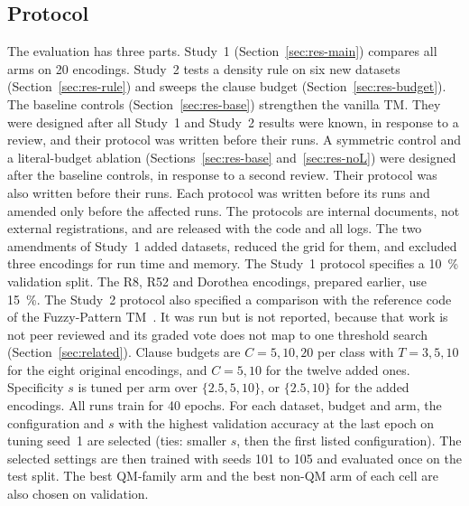 \documentclass[preprint,12pt,times]{elsarticle}
\newcommand{\add}[1]{{\color{blue}#1}}
\begin{document}
\subsection{Protocol}
\label{sec:protocol}
The evaluation has three parts. Study~1 (Section~\ref{sec:res-main}) compares all arms on 20 encodings. Study~2 tests a density rule on six new datasets (Section~\ref{sec:res-rule}) and sweeps the clause budget (Section~\ref{sec:res-budget}). The baseline controls (Section~\ref{sec:res-base}) strengthen the vanilla TM. They were designed after all Study~1 and Study~2 results were known, in response to a review, and their protocol was written before their runs.
\add{A symmetric control and a literal-budget ablation (Sections~\ref{sec:res-base} and~\ref{sec:res-noL}) were designed after the baseline controls, in response to a second review. Their protocol was also written before their runs.}
Each protocol was written before its runs and amended only before the affected runs. The protocols are internal documents, not external registrations, and are released with the code and all logs.
The two amendments of Study~1 added datasets, reduced the grid for them, and excluded three encodings for run time and memory.
The Study~1 protocol specifies a \SI{10}{\percent} validation split. The R8, R52 and Dorothea encodings, prepared earlier, use \SI{15}{\percent}.
The Study~2 protocol also specified a comparison with the reference code of the Fuzzy-Pattern TM~\cite{hnilov2025fptm}. It was run but is not reported, because that work is not peer reviewed and its graded vote does not map to one threshold search (Section~\ref{sec:related}).
Clause budgets are $C = 5, 10, 20$ per class with $T = 3, 5, 10$ for the eight original encodings, and $C = 5, 10$ for the twelve added ones.
Specificity $s$ is tuned per arm over $\{2.5, 5, 10\}$, or $\{2.5, 10\}$ for the added encodings.
All runs train for 40 epochs.
For each dataset, budget and arm, the configuration and $s$ with the highest validation accuracy at the last epoch on tuning seed~1 are selected (ties: smaller $s$, then the first listed configuration).
The selected settings are then trained with seeds 101 to 105 and evaluated once on the test split.
The best QM-family arm and the best non-QM arm of each cell are also chosen on validation.
\end{document}
